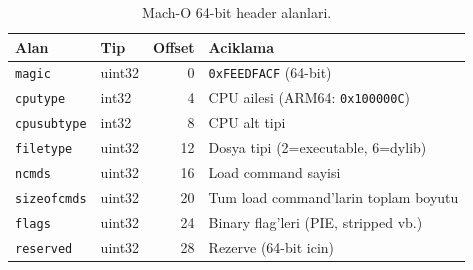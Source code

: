\begin{table}[htbp]
\centering
\begin{tabular}{llrl}
\toprule
\textbf{\color{sectioncyan}Alan} & \textbf{\color{sectioncyan}Tip} & \textbf{\color{sectioncyan}Offset} & \textbf{\color{sectioncyan}Aciklama} \\
\midrule
\texttt{magic}      & uint32 & 0  & \texttt{0xFEEDFACF} (64-bit) \\
\texttt{cputype}    & int32  & 4  & CPU ailesi (ARM64: \texttt{0x100000C}) \\
\texttt{cpusubtype} & int32  & 8  & CPU alt tipi \\
\texttt{filetype}   & uint32 & 12 & Dosya tipi (2=executable, 6=dylib) \\
\texttt{ncmds}      & uint32 & 16 & Load command sayisi \\
\texttt{sizeofcmds} & uint32 & 20 & Tum load command'larin toplam boyutu \\
\texttt{flags}      & uint32 & 24 & Binary flag'leri (PIE, stripped vb.) \\
\texttt{reserved}   & uint32 & 28 & Rezerve (64-bit icin) \\
\bottomrule
\end{tabular}
\caption{Mach-O 64-bit header alanlari.}
\label{tab:macho-header}
\end{table}

